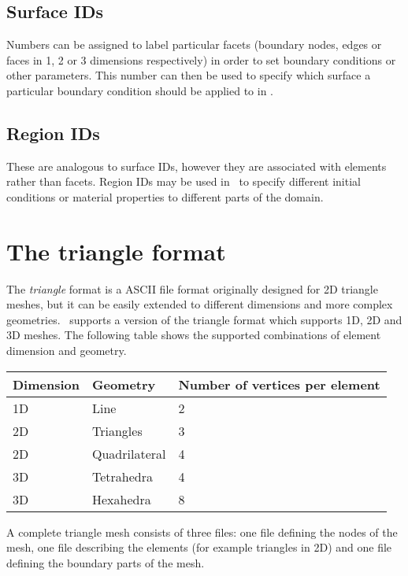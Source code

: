 \subsection{Surface IDs}\label{sec:surface_ids}
Numbers can be assigned to label particular facets (boundary nodes, edges or
faces in 1, 2 or 3 dimensions respectively) in order to set
boundary conditions or other parameters. This number can then be used to
specify which surface a particular boundary condition should be applied to
in \fluidity. 

\subsection{Region IDs}\label{sec:region_ids}
 These are analogous to surface IDs, however they are
associated with elements rather than facets. Region IDs may be used in
\fluidity\ to specify different initial conditions or material properties to
different parts of the domain.



\section{The triangle format}\label{sec:triangle_format}

The \emph{triangle} format is a ASCII file format originally designed for 2D
triangle meshes, but it can be easily extended to different dimensions and
more complex geometries.  \fluidity\ supports a version of the triangle format
which supports 1D, 2D and 3D meshes.  The following table shows the supported
combinations of element dimension and geometry.

\begin{tabular}{ l l l }
\textbf{Dimension} & \textbf{Geometry} & \textbf{Number of vertices per element} \\ \hline
1D & Line & 2\\ 
2D & Triangles &  3 \\ 
2D & Quadrilateral & 4 \\
3D & Tetrahedra & 4 \\ 
3D & Hexahedra & 8 \\
\end{tabular}

A complete triangle mesh consists of three files: one file defining the
nodes of the mesh, one file describing the elements (for example triangles
in 2D) and one file defining the boundary parts of the mesh.

